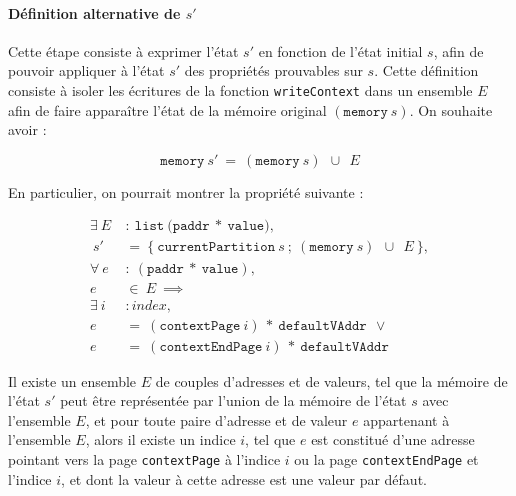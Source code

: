 			\paragraph{Définition alternative de $s'$} Cette étape consiste à exprimer l'état $s'$ en fonction de l'état initial $s$, afin de pouvoir appliquer à l'état $s'$ des propriétés prouvables sur $s$. Cette définition consiste à isoler les écritures de la fonction \texttt{writeContext} dans un ensemble $E$ afin de faire apparaître l'état de la mémoire original $(\mathtt{memory}~s)$.
			On souhaite avoir :

			$$\mathtt{memory}~s'~=~(\mathtt{memory}~s)~~\cup~~E$$

			En particulier, on pourrait montrer la propriété suivante :

			\begin{align*}
				\exists~E~&:~\mathtt{list}~(\mathtt{paddr}~*~\mathtt{value)},\\
				      ~s'~&=~\mathtt{\{~currentPartition}~s~;~(\mathtt{memory}~s)~~\cup~~E~\mathtt{\}},\\
				\forall~e~&:~(\mathtt{paddr}~*~\mathtt{value}),\\
				        e~&\in~E~\implies\\
				\exists~i~&: index,\\
				        e~&=~(\mathtt{contextPage}~i)~*~\mathtt{defaultVAddr}~~\lor\\
				        e~&=~(\mathtt{contextEndPage}~i)~*~\mathtt{defaultVAddr}
			\end{align*}

			\begin{theorem}
				Il existe un ensemble $E$ de couples d'adresses et de valeurs, tel que la mémoire de l'état $s'$ peut être représentée par l'union de la mémoire de l'état $s$ avec l'ensemble $E$, et pour toute paire d'adresse et de valeur $e$ appartenant à l'ensemble $E$, alors il existe un indice $i$, tel que $e$ est constitué d'une adresse pointant vers la page \texttt{contextPage} à l'indice $i$ ou la page \texttt{contextEndPage} et l'indice $i$, et dont la valeur à cette adresse est une valeur par défaut.
			\label{prop:s'redef}
			\end{theorem}

